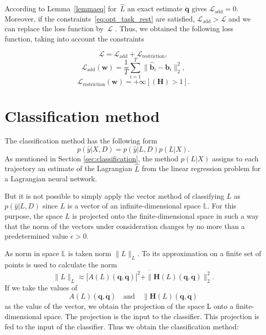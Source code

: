 \documentclass[sn-mathphys-num]{sn-jnl}
\theoremstyle{thmstylethree}
\theoremstyle{thmstyletwo}
\theoremstyle{thmstyleone}
\begin{document}
According to Lemma~\ref{lemmaeq} for~$\hat{L}$ an exact estimate $\ddot{\mathbf{q}}$ gives $\mathcal{L}_\text{add} = 0$. Moreover, if the constraints~\eqref{eq:opt_task_rest} are satisfied, $\mathcal{L}_\text{add} > \mathcal{L}$ and we can replace the loss function by~$\mathcal{L}$ . Thus, we obtained the following loss function, taking into account the constraints

\begin{equation}
    \mathcal{L} = \mathcal{L}_\text{add} + \mathcal{L}_\text{restriction},
\end{equation}
\begin{equation}
    \mathcal{L}_\text{add}(\textbf{w}) = \frac{1}{T}\sum_{i=1}^{T} \| \mathbf{\hat{b}}_i - \mathbf{b}_i \|_2^2,
\end{equation}
\begin{equation}
    \mathcal{L}_\text{restriction}(\textbf{w}) = +\infty[\left(\mathbf{H}\right) > 1].
\end{equation}
\section{Classification method}
The classification method has the following form 
\[
p(\hat{y}|X, D) = p(\hat{y}|L, D)p(L|X).
\] 
As mentioned in Section \ref{sec:classification}, the method $p(L|X)$ assigns to each trajectory an estimate of the Lagrangian $\hat{L}$ from the linear regression problem for a Lagrangian neural network.

But it is not possible to simply apply the vector method of classifying $L$ as $p(\hat{y}|L, D)$ since $L$ is
a vector of an infinite-dimensional space $\mathbb{L}$. For this purpose, the space $L$ is projected onto the finite-dimensional space in such a way that the norm of the vectors under consideration changes by no more than a predetermined value $\epsilon > 0$.

As norm in space $\mathbb{L}$ is taken norm $\|L\|_L$. To its approximation on a finite set of points is used to calculate the norm 
\[
\|L\|_L \approx \overline{|A(L)\left(\mathbf{q}, \dot{\mathbf{q}}\right)|^2 + \|\mathbf{H}(L)\left(\mathbf{q}, \dot{\mathbf{q}}\right)\|_2^2}.
\] 
If we take the values of 
\[A(L)\left(\mathbf{q}, \dot{\mathbf{q}}\right) 
\quad \text{and} \quad 
\|\mathbf{H}(L)\left(\mathbf{q}, \dot{\mathbf{q}}\right) 
\]
as the value of the vector, we obtain the projection of the space L onto a finite-dimensional space. The projection is the input to the classifier. This projection is fed to the input of the classifier. Thus we obtain the classification method: 
\end{document}
